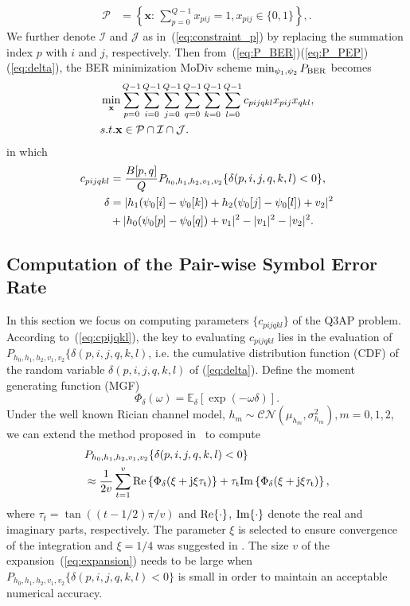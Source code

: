 \documentclass[journal]{IEEEtran}
\newcommand{\BER}{\rm{BER}}
\renewcommand{\Re}{\rm Re}
\renewcommand{\Im}{\rm Im}
\begin{document}
\begin{align}
    \mathcal{P} & = \left\{\mathbf{x}:\,\sum_{p=0}^{Q-1}x_{pij} = 1,
    x_{pij}\in\{0, 1\}\right\}, \label{eq:constraint_p}.
\end{align}
We further denote $\mathcal{I}$ and $\mathcal{J}$ as in~(\ref{eq:constraint_p})
by replacing the summation index $p$ with $i$ and $j$, respectively. Then
from~(\ref{eq:P_BER})(\ref{eq:P_PEP})(\ref{eq:delta}), the BER minimization
MoDiv scheme $\min_{\psi_1, \psi_2}P_{\BER}$ becomes
\begin{align}
    & \min_{\mathbf{x}}\sum_{p=0}^{Q-1}\sum_{i=0}^{Q-1}\sum_{j=0}^{Q-1}
    \sum_{q=0}^{Q-1}\sum_{k=0}^{Q-1}\sum_{l=0}^{Q-1}c_{pijqkl}x_{pij}x_{qkl},
    \label{eq:Q3AP}\\
    & \mbox{s.t. } \mathbf{x}\in \mathcal{P}\cap\mathcal{I}\cap\mathcal{J}.
    \notag
\end{align}
in which
\begin{align}
    c_{pijqkl} & = \frac{B[p, q]}{Q}P_{h_0,h_1,h_2,v_1,v_2}\{\delta(p,i,j,q,k,l)
    < 0\},
    \label{eq:cpijqkl} \\
    \delta & = |h_1(\psi_0[i] - \psi_0[k])+h_2(\psi_0[j] - \psi_0[l])+v_2|^2 
 \notag
    \\
    & + |h_0(\psi_0[p] - \psi_0[q]) + v_1|^2 - |v_1|^2 -
    |v_2|^2.\label{eq:delta_pijqkl}
\end{align}

\subsection{Computation of the Pair-wise Symbol Error Rate}

In this section we focus on computing parameters $\{c_{pijqkl}\}$ of the Q3AP
problem. According to~(\ref{eq:cpijqkl}), the key to evaluating $c_{pijqkl}$
lies in the evaluation of $P_{h_0,h_1,h_2,v_1,v_2}\{\delta(p,i,j,q,k,l)$, i.e.
the cumulative distribution function (CDF) of the random variable
$\delta(p,i,j,q,k,l)$ of (\ref{eq:delta}). Define the moment generating function
(MGF)
\[
    \Phi_{\delta}(\omega) = \mathbb{E}_{\delta}[\exp(-\omega\delta)].
\]
Under the well known Rician channel model, 
$h_m\sim\mathcal{CN}(\mu_{h_m},\sigma_{h_m}^2), m=0,1,2$, we can extend the
method proposed in~\cite{harvind2005symbol, taricco2002exact} to compute
\begin{align}
    & P_{h_0,h_1,h_2,v_1,v_2}\{\delta(p,i,j,q,k,l) < 0\} \notag \\
    & \approx \frac{1}{2v}\sum_{t=1}^v \Re\left\{\Phi_{\delta}(\xi +
    j\xi\tau_t)\right\} + \tau_t\Im\left\{\Phi_{\delta}(\xi +
    j\xi\tau_t)\right\},
    \label{eq:expansion}
\end{align}
where $\tau_t = \tan((t- 1/2)\pi/v)$ and $\Re\{\cdot\}$, $\Im\{\cdot\}$ denote
the real and imaginary parts, respectively. The parameter $\xi$ is selected to
ensure convergence of the integration and $\xi = 1/4$ was suggested in
\cite{taricco2002exact}. The size $v$ of the expansion~(\ref{eq:expansion})
needs to be large when $ P_{h_0,h_1,h_2,v_1,v_2}\{\delta(p,i,j,q,k,l) < 0\}$ is
small in order to maintain an acceptable numerical accuracy.
\end{document}
